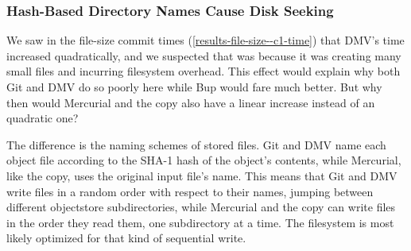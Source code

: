 \subsubsection{Hash-Based Directory Names Cause Disk Seeking}


We saw in the file-size commit times (\autoref{results-file-size--c1-time}) that DMV's time increased quadratically, and we suspected that was because it was creating many small files and incurring filesystem overhead.
This effect would explain why both Git and DMV do so poorly here while Bup would fare much better.
But why then would Mercurial and the copy also have a linear increase instead of an quadratic one?

The difference is the naming schemes of stored files.
Git and DMV name each object file according to the SHA-1 hash of the object's contents, while Mercurial, like the copy, uses the original input file's name.
This means that Git and DMV write files in a random order with respect to their names, jumping between different \gls{objectstore} subdirectories, while Mercurial and the copy can write files in the order they read them, one subdirectory at a time.
The filesystem is most likely optimized for that kind of sequential write.
